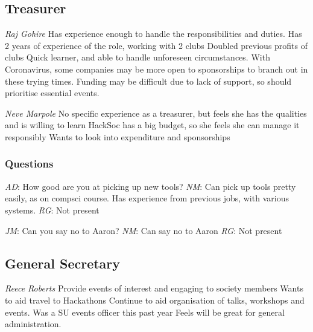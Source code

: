 \documentclass[11pt]{meetingmins}
\begin{document}
\subsection{Treasurer}
\begin{items}
	\item
	\textit{Raj Gohire}
		\subitem
		Has experience enough to handle the responsibilities and duties.
		\subitem
		Has 2 years of experience of the role, working with 2 clubs
		\subitem
		Doubled previous profits of clubs
		\subitem
		Quick learner, and able to handle unforeseen circumstances.
		\subitem
		With Coronavirus, some companies may be more open to sponsorships to branch out in these trying times.
		\subitem
		Funding may be difficult due to lack of support, so should prioritise essential events.

	\item
	\textit{Neve Marpole}
		\subitem
		No specific experience as a treasurer, but feels she has the qualities and is willing to learn
		\subitem
		HackSoc has a big budget, so she feels she can manage it responsibly
		\subitem
		Wants to look into expenditure and sponsorships

\end{items}

\subsubsection{Questions}	
\begin{items}
	\item
	\textit{AD}: How good are you at picking up new tools?
		\subitem
		\textit{NM}:
			\subsubitem
			Can pick up tools pretty easily, as on compsci course.
			\subsubitem
			Has experience from previous jobs, with various systems.
		\subitem
		\textit{RG}:
			\subsubitem
			Not present
	\item
	\textit{JM}: Can you say no to Aaron?
		\subitem
		\textit{NM}: Can say no to Aaron
		\subitem
		\textit{RG}: Not present
\end{items}

\subsection{General Secretary}
\begin{items}
	\item
	\textit{Reece Roberts}
		\subitem
		Provide events of interest and engaging to society members
		\subitem
		Wants to aid travel to Hackathons
		\subitem
		Continue to aid organisation of talks, workshops and events.
		\subitem
		Was a SU events officer this past year
		\subitem
		Feels will be great for general administration.
\end{items}
\end{document}
